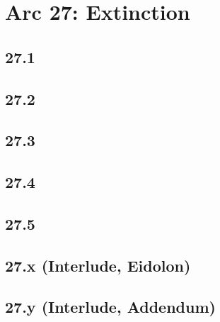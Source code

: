 \part{Arc 27: Extinction}
 \chapter{27.1}
 \chapter{27.2}
 \chapter{27.3}
 \chapter{27.4}
 \chapter{27.5}
 \chapter{27.x (Interlude, Eidolon)}
 \chapter{27.y (Interlude, Addendum)}








